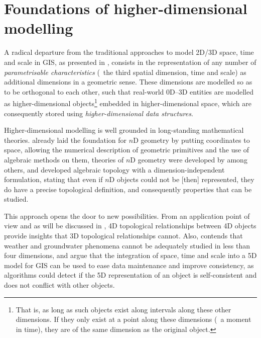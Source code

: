 \section{Foundations of higher-dimensional modelling}
\label{se:nd-modelling-foundations}


A radical departure from the traditional approaches to model 2D/3D space, time and scale in GIS, as presented in , consists in the representation of any number of \emph{parametrisable characteristics} (\eg\ the third spatial dimension, time and scale) as additional dimensions in a geometric sense.
These dimensions are modelled so as to be orthogonal to each other, such that real-world 0D--3D entities are modelled as higher-dimensional objects\footnote{That is, as long as such objects exist along intervals along these other dimensions. If they only exist at a point along these dimensions (\eg\ a moment in time), they are of the same dimension as the original object.} embedded in higher-dimensional space, which are consequently stored using \emph{higher-dimensional data structures}.


Higher-dimensional modelling is well grounded in long-standing mathematical theories.
\citet{Descartes37} already laid the foundation for $n$D geometry by putting coordinates to space, allowing the numerical description of geometric primitives and the use of algebraic methods on them, theories of $n$D geometry were developed by \citet{Riemann68} among others, and \citet{Poincare95} developed algebraic topology with a dimension-independent formulation, stating that even if $n$D objects could not be [then] represented, they do have a precise topological definition, and consequently properties that can be studied.


This approach opens the door to new possibilities.
From an application point of view and as will be discussed in , 4D topological relationships between 4D objects provide insights that 3D topological relationships cannot.
Also, \citet{McKenzie01} contends that weather and groundwater phenomena cannot be adequately studied in less than four dimensions, and \citet{vanOosterom10} argue that the integration of space, time and scale into a 5D model for GIS can be used to ease data maintenance and improve consistency, as algorithms could detect if the 5D representation of an object is self-consistent and does not conflict with other objects.

